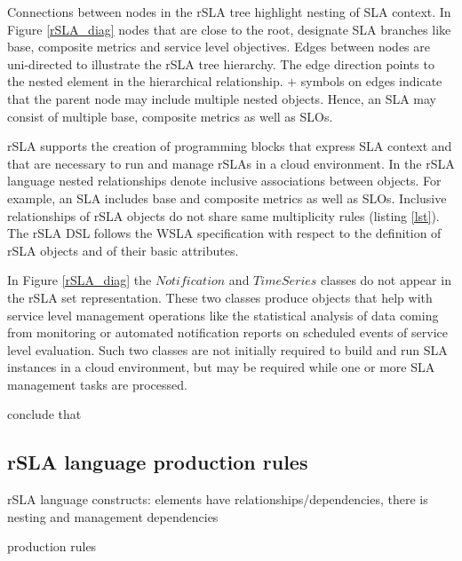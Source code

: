Connections between nodes in the rSLA tree highlight nesting of SLA context. In Figure \ref{rSLA_diag} nodes that are close to the root, designate SLA branches like base, composite metrics and service level objectives. Edges between nodes are uni-directed to illustrate the rSLA tree hierarchy. The edge direction points to the nested element in the hierarchical relationship. $+$ symbols on edges indicate that the parent node may include multiple nested objects. Hence, an SLA may consist of multiple base, composite metrics as well as SLOs.



rSLA supports the creation of programming blocks that express SLA context and that are necessary to run and manage rSLAs in a cloud environment. 
In the rSLA language nested relationships denote inclusive associations between objects. For example, an SLA includes base and composite metrics as 
well as SLOs. Inclusive relationships of rSLA objects do not share same multiplicity rules (listing \ref{lst}). The rSLA DSL follows the WSLA 
specification \cite{wsla} with respect to the definition of rSLA objects and of their basic attributes.

In Figure \ref{rSLA_diag} the $Notification$ and $TimeSeries$ classes do not appear in the rSLA set representation. These two classes produce objects 
that help with service level management operations like the statistical analysis of data coming from monitoring or automated notification reports on 
scheduled events of service level evaluation. Such two classes are not initially required to build and run SLA instances in a cloud environment, but 
may be required while one or more SLA management tasks are processed.



conclude that
 
\subsection{rSLA language production rules}

rSLA language constructs: elements have relationships/dependencies, there is nesting and management dependencies

production rules